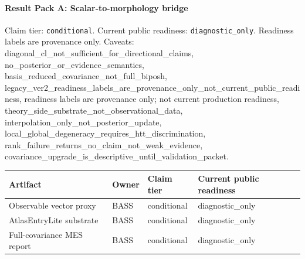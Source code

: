 \paragraph{Result Pack A: Scalar-to-morphology bridge}
Claim tier: \texttt{conditional}. Current public readiness:
\texttt{diagnostic\_only}. Readiness labels are
provenance only. Caveats: diagonal\_cl\_not\_sufficient\_for\_directional\_claims, no\_posterior\_or\_evidence\_semantics, basis\_reduced\_covariance\_not\_full\_biposh, legacy\_ver2\_readiness\_labels\_are\_provenance\_only\_not\_current\_public\_readiness, readiness labels are provenance only; not current production readiness, theory\_side\_substrate\_not\_observational\_data, interpolation\_only\_not\_posterior\_update, local\_global\_degeneracy\_requires\_htt\_discrimination, rank\_failure\_returns\_no\_claim\_not\_weak\_evidence, covariance\_upgrade\_is\_descriptive\_until\_validation\_packet.

\begin{center}
\begin{tabular}{llll}
\hline
Artifact & Owner & Claim tier & Current public readiness \\
\hline
Observable vector proxy & BASS & conditional & diagnostic\_only \\
AtlasEntryLite substrate & BASS & conditional & diagnostic\_only \\
Full-covariance MES report & BASS & conditional & diagnostic\_only \\
\hline
\end{tabular}
\end{center}
